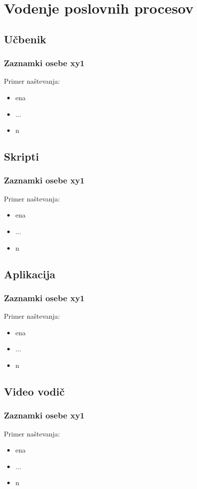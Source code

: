 \chapter{Vodenje poslovnih procesov} \label{chap17SI}

\section{Učbenik}
\subsection{Zaznamki osebe xy1}
Primer naštevanja:
\begin{itemize}
	\item ena
	\item ...
	\item n	
\end{itemize}

\section{Skripti}
\subsection{Zaznamki osebe xy1}
Primer naštevanja:
\begin{itemize}
	\item ena
	\item ...
	\item n	
\end{itemize}

\section{Aplikacija}
\subsection{Zaznamki osebe xy1}
Primer naštevanja:
\begin{itemize}
	\item ena
	\item ...
	\item n	
\end{itemize}

\section{Video vodič}
\subsection{Zaznamki osebe xy1}
Primer naštevanja:
\begin{itemize}
	\item ena
	\item ...
	\item n	
\end{itemize}